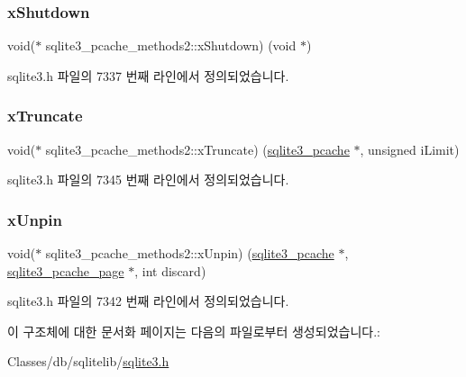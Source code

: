 \subsubsection{\texorpdfstring{x\+Shutdown}{xShutdown}}
{\footnotesize\ttfamily void($\ast$ sqlite3\+\_\+pcache\+\_\+methods2\+::x\+Shutdown) (void $\ast$)}



sqlite3.\+h 파일의 7337 번째 라인에서 정의되었습니다.

\mbox{\label{structsqlite3__pcache__methods2_a711d60b1895622a10186a2894cef1383}} 
\subsubsection{\texorpdfstring{x\+Truncate}{xTruncate}}
{\footnotesize\ttfamily void($\ast$ sqlite3\+\_\+pcache\+\_\+methods2\+::x\+Truncate) (\hyperlink{sqlite3_8h_a096c453d937d51f7926d7d31c8e0bd2f}{sqlite3\+\_\+pcache} $\ast$, unsigned i\+Limit)}



sqlite3.\+h 파일의 7345 번째 라인에서 정의되었습니다.

\mbox{\label{structsqlite3__pcache__methods2_a8fcb4ba48106aac8dfff247baea06e1a}} 
\subsubsection{\texorpdfstring{x\+Unpin}{xUnpin}}
{\footnotesize\ttfamily void($\ast$ sqlite3\+\_\+pcache\+\_\+methods2\+::x\+Unpin) (\hyperlink{sqlite3_8h_a096c453d937d51f7926d7d31c8e0bd2f}{sqlite3\+\_\+pcache} $\ast$, \hyperlink{structsqlite3__pcache__page}{sqlite3\+\_\+pcache\+\_\+page} $\ast$, int discard)}



sqlite3.\+h 파일의 7342 번째 라인에서 정의되었습니다.



이 구조체에 대한 문서화 페이지는 다음의 파일로부터 생성되었습니다.\+:\begin{DoxyCompactItemize}
\item 
Classes/db/sqlitelib/\hyperlink{sqlite3_8h}{sqlite3.\+h}\end{DoxyCompactItemize}

